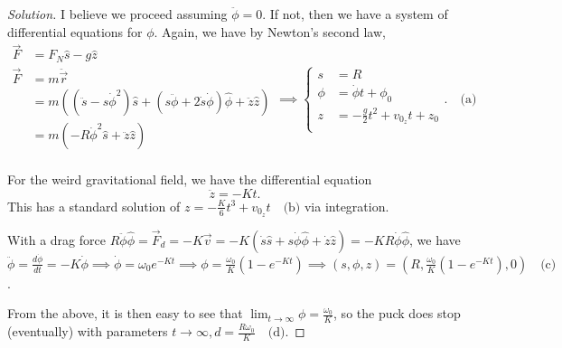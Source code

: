 \documentclass{article}
\theoremstyle{norm}
\begin{document}
\begin{proof}[Solution]
I believe we proceed assuming $\ddot{\phi} = 0$. If not, then we have a
system of differential equations for $\phi$. Again, we have by
Newton's second law,
\[ \begin{aligned}
\vec{F} &= F_N \hat{s} - g \hat{z} \\
\vec{F} &= m \ddot{\vec{r}} \\
&= m \left(\left( \ddot{s} - s \dot{\phi}^2 \right) \hat{s} + \left(s
\ddot{\phi} + 2 \dot{s} \dot{\phi}\right) \hat{\phi} + \ddot{z}
\hat{z}\right) \\
&= m\left(-R \dot{\phi}^2 \hat{s} + \ddot{z} \hat{z}\right) \\
\end{aligned} \implies \boxed{\left \lbrace \begin{aligned}
s &= R \\
\phi &= \dot{\phi} t + \phi_0 \\
z &= -\frac{g}{2} t^2 + v_{0_z} t + z_0 \\
\end{aligned} \right.}. \quad \textrm{(a)} \]

For the weird gravitational field, we have the differential equation
\[ \ddot{z} = -Kt. \]
This has a standard solution of $\boxed{z = -\frac{K}{6} t^3 + v_{0_z}
t} \quad \textrm{(b)}$ via integration.

With a drag force $R \ddot{\phi} \hat{\phi} = \vec{F}_d = -K \vec{v} =
-K (\dot{s} \hat{s} + s \dot{\phi} \hat{\phi} + \dot{z} \hat{z}) = -KR
\dot{\phi}\hat{\phi}$, we have $\ddot{\phi} = \frac{d \dot{\phi}}{dt} =
-K \dot{\phi} \implies \dot{\phi} = \omega_0 e^{-K t} \implies \phi =
\frac{\omega_0}{K} \left(1 - e^{-Kt}\right) \implies \boxed{(s, \phi, z)
= \left(R, \frac{\omega_0}{K}\left(1 - e^{-Kt}\right), 0\right)} \quad
\textrm{(c)}$.

From the above, it is then easy to see that $\lim_{t \to \infty} \phi =
\frac{\omega_0}{K}$, so the puck does stop (eventually) with parameters
$\boxed{t \to \infty, d = \frac{R \omega_0}{K}} \quad \textrm{(d)}$.
\end{proof}
\end{document}

